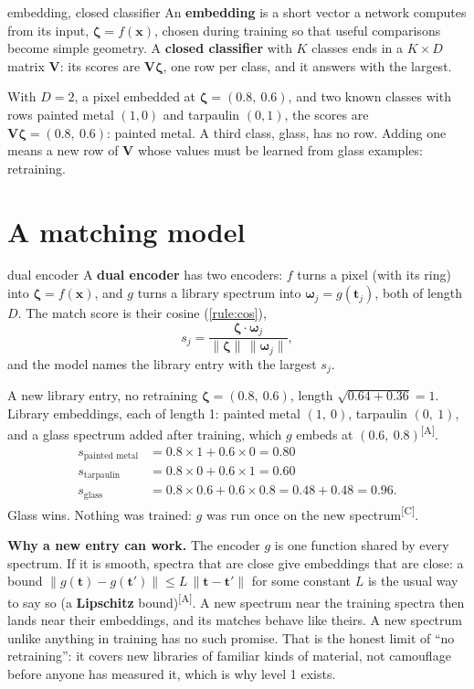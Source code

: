 \documentclass[11pt,a4paper,oneside,openany]{book}
\newcommand{\B}[1]{{\symbf{#1}}}
\newcommand{\B}[1]{{\bm{#1}}}
\newcommand{\comp}{\textsuperscript{\textsf{\scriptsize[C]}}}
\newcommand{\assm}{\textsuperscript{\textsf{\scriptsize[A]}}}
\newcommand{\nrm}[1]{\lVert #1\rVert}
\newcommand{\vx}{\B{x}}
\newcommand{\vt}{\B{t}}
\newcommand{\vzeta}{\B{\zeta}}
\begin{document}
\begin{defn}{embedding, closed classifier}
An \textbf{embedding} is a short vector a network computes from its input, $\vzeta=f(\vx)$, chosen during training so that useful comparisons become simple
geometry. A \textbf{closed classifier} with $K$ classes ends in a $K\times D$ matrix $\B{V}$: its scores are $\B{V}\vzeta$, one row per class, and it answers with the largest.
\end{defn}

With $D=2$, a pixel embedded at $\vzeta=(0.8,\ 0.6)$, and two known classes with rows painted metal $(1,0)$ and tarpaulin $(0,1)$, the scores are $\B{V}\vzeta=(0.8,\ 0.6)$:
painted metal. A third class, glass, has no row. Adding one means a new row of $\B{V}$ whose values must be learned from glass examples: retraining.

\section{A matching model}

\begin{defn}{dual encoder}
A \textbf{dual encoder} has two encoders: $f$ turns a pixel (with its ring) into $\vzeta=f(\vx)$, and $g$ turns a library spectrum into $\B{\omega}_j=g(\vt_j)$, both of
length $D$. The match score is their cosine (\cref{rule:cos}),
\[
  s_j=\frac{\vzeta\cdot\B{\omega}_j}{\nrm{\vzeta}\,\nrm{\B{\omega}_j}} ,
\]
and the model names the library entry with the largest $s_j$.
\end{defn}

\begin{worked}[label=we:dualenc]{A new library entry, no retraining}
$\vzeta=(0.8,\ 0.6)$, length $\sqrt{0.64+0.36}=1$. Library embeddings, each of length 1: painted metal $(1,\ 0)$, tarpaulin $(0,\ 1)$, and a glass spectrum added after
training, which $g$ embeds at $(0.6,\ 0.8)$\assm.
\begin{align*}
s_{\text{painted metal}} &= 0.8\times1+0.6\times0=0.80\\
s_{\text{tarpaulin}} &= 0.8\times0+0.6\times1=0.60\\
s_{\text{glass}} &= 0.8\times0.6+0.6\times0.8=0.48+0.48=0.96 .
\end{align*}
Glass wins. Nothing was trained: $g$ was run once on the new spectrum\comp.
\end{worked}

\textbf{Why a new entry can work.} The encoder $g$ is one function shared by every spectrum. If it is smooth, spectra that are close give embeddings that are close: a
bound $\nrm{g(\vt)-g(\vt')}\le L\,\nrm{\vt-\vt'}$ for some constant $L$ is the usual way to say so (a \textbf{Lipschitz} bound)\assm. A new spectrum near the
training spectra then lands near their embeddings, and its matches behave like theirs. A new spectrum unlike anything in training has no such promise. That is the honest
limit of ``no retraining'': it covers new libraries of familiar kinds of material, not camouflage before anyone has measured it, which is why level 1 exists.
\end{document}

